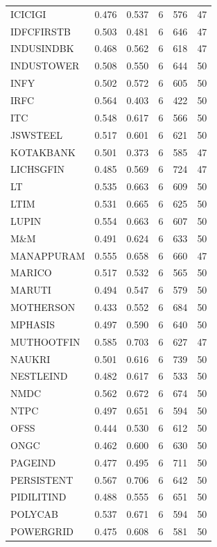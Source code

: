 \begin{small}
\begin{longtable}{l r r r r r}
ICICIGI     & 0.476 & 0.537 & 6 & 576 & 47 \\
IDFCFIRSTB  & 0.503 & 0.481 & 6 & 646 & 47 \\
INDUSINDBK  & 0.468 & 0.562 & 6 & 618 & 47 \\
INDUSTOWER  & 0.508 & 0.550 & 6 & 644 & 50 \\
INFY        & 0.502 & 0.572 & 6 & 605 & 50 \\
IRFC        & 0.564 & 0.403 & 6 & 422 & 50 \\
ITC         & 0.548 & 0.617 & 6 & 566 & 50 \\
JSWSTEEL    & 0.517 & 0.601 & 6 & 621 & 50 \\
KOTAKBANK   & 0.501 & 0.373 & 6 & 585 & 47 \\
LICHSGFIN   & 0.485 & 0.569 & 6 & 724 & 47 \\
LT          & 0.535 & 0.663 & 6 & 609 & 50 \\
LTIM        & 0.531 & 0.665 & 6 & 625 & 50 \\
LUPIN       & 0.554 & 0.663 & 6 & 607 & 50 \\
M\&M        & 0.491 & 0.624 & 6 & 633 & 50 \\
MANAPPURAM  & 0.555 & 0.658 & 6 & 660 & 47 \\
MARICO      & 0.517 & 0.532 & 6 & 565 & 50 \\
MARUTI      & 0.494 & 0.547 & 6 & 579 & 50 \\
MOTHERSON   & 0.433 & 0.552 & 6 & 684 & 50 \\
MPHASIS     & 0.497 & 0.590 & 6 & 640 & 50 \\
MUTHOOTFIN  & 0.585 & 0.703 & 6 & 627 & 47 \\
NAUKRI      & 0.501 & 0.616 & 6 & 739 & 50 \\
NESTLEIND   & 0.482 & 0.617 & 6 & 533 & 50 \\
NMDC        & 0.562 & 0.672 & 6 & 674 & 50 \\
NTPC        & 0.497 & 0.651 & 6 & 594 & 50 \\
OFSS        & 0.444 & 0.530 & 6 & 612 & 50 \\
ONGC        & 0.462 & 0.600 & 6 & 630 & 50 \\
PAGEIND     & 0.477 & 0.495 & 6 & 711 & 50 \\
PERSISTENT  & 0.567 & 0.706 & 6 & 642 & 50 \\
PIDILITIND  & 0.488 & 0.555 & 6 & 651 & 50 \\
POLYCAB     & 0.537 & 0.671 & 6 & 594 & 50 \\
POWERGRID   & 0.475 & 0.608 & 6 & 581 & 50 \\

\end{longtable}
\end{small}
